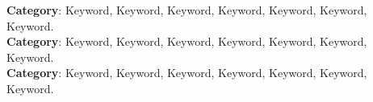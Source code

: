 {\noindent
  \raggedright%
  \textbf{Category}{: Keyword, Keyword, Keyword, Keyword, Keyword, Keyword, Keyword.} \\
  \textbf{Category}{: Keyword, Keyword, Keyword, Keyword, Keyword, Keyword, Keyword.} \\
  \textbf{Category}{: Keyword, Keyword, Keyword, Keyword, Keyword, Keyword, Keyword.}
}
